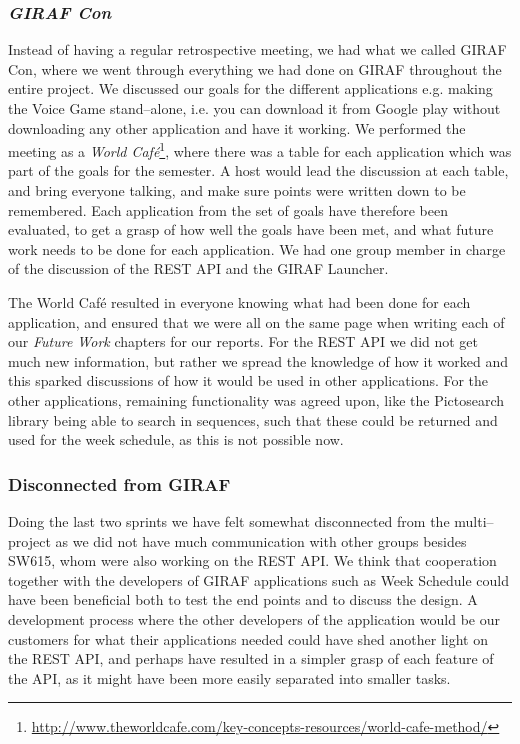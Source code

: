 \subsubsection*{\textit{GIRAF Con}}
Instead of having a regular retrospective meeting, we had what we called GIRAF Con, where we went through everything we had done on GIRAF throughout the entire project.
We discussed our goals for the different applications e.g. making the Voice Game stand--alone, i.e. you can download it from Google play without downloading any other application and have it working.
We performed the meeting as a \textit{World Café}\footnote{\url{http://www.theworldcafe.com/key-concepts-resources/world-cafe-method/}}, where there was a table for each application which was part of the goals for the semester.
A host would lead the discussion at each table, and bring everyone talking, and make sure points were written down to be remembered.
Each application from the set of goals have therefore been evaluated, to get a grasp of how well the goals have been met, and what future work needs to be done for each application.
We had one group member in charge of the discussion of the REST API and the GIRAF Launcher.

The World Café resulted in everyone knowing what had been done for each application, and ensured that we were all on the same page when writing each of our \textit{Future Work} chapters for our reports.
For the REST API we did not get much new information, but rather we spread the knowledge of how it worked and this sparked discussions of how it would be used in other applications.
For the other applications, remaining functionality was agreed upon, like the Pictosearch library being able to search in sequences, such that these could be returned and used for the week schedule, as this is not possible now.

\subsubsection*{Disconnected from GIRAF}
Doing the last two sprints we have felt somewhat disconnected from the multi--project as we did not have much communication with other groups besides SW615, whom were also working on the REST API.
We think that cooperation together with the developers of GIRAF applications such as Week Schedule could have been beneficial both to test the end points and to discuss the design.
A development process where the other developers of the application would be our customers for what their applications needed could have shed another light on the REST API, and perhaps have resulted in a simpler grasp of each feature of the API, as it might have been more easily separated into smaller tasks.

